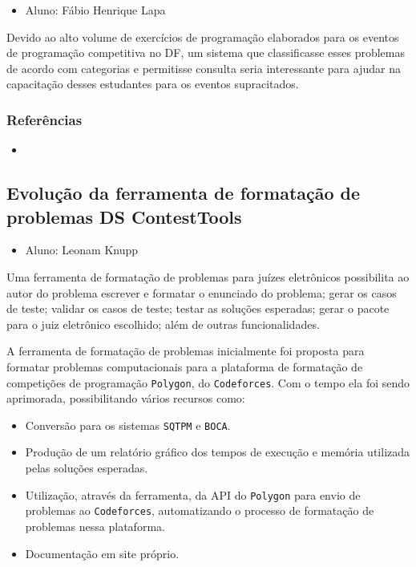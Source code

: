 \documentclass{article}
\newcommand*{\nsubsection}[1]{
    \subsection*{#1}
}
\newcommand{\polygon}{\texttt{Polygon}\xspace}
\newcommand{\codeforces}{\texttt{Codeforces}\xspace}
\newcommand{\sqtpm}{\texttt{SQTPM}\xspace}
\newcommand{\boca}{\texttt{BOCA}\xspace}
\begin{document}
\begin{itemize}
	\item Aluno: Fábio Henrique Lapa
\end{itemize}

Devido ao alto volume de exercícios de programação elaborados para os eventos de programação competitiva no DF, um sistema que classificasse esses problemas de acordo com categorias e permitisse consulta seria interessante para ajudar na capacitação desses estudantes para os eventos supracitados.



\subsubsection*{Referências}

\begin{itemize}
	\item {}
\end{itemize}


\nsubsection{Evolução da ferramenta de formatação de problemas DS ContestTools}


\begin{itemize}
	\item Aluno: Leonam Knupp
\end{itemize}


Uma ferramenta de formatação de problemas para juízes eletrônicos possibilita ao autor do problema escrever e formatar o enunciado do problema; gerar os casos de teste; validar os casos de teste; testar as soluções esperadas;  gerar o pacote para o juiz eletrônico escolhido; além de outras funcionalidades.

A ferramenta de formatação de problemas  inicialmente foi proposta para formatar problemas computacionais para a plataforma de formatação de competições de programação \polygon, do \codeforces. Com o tempo ela foi sendo aprimorada, possibilitando vários recursos como:

\begin{itemize}
	\item Conversão para os sistemas \sqtpm e \boca.
	\item Produção de um relatório gráfico dos tempos de execução e memória utilizada pelas soluções esperadas.
	\item Utilização, através da ferramenta, da API do \polygon para envio de problemas ao \codeforces, automatizando o processo de formatação de problemas nessa plataforma.
	\item Documentação em site próprio.
\end{itemize}
\end{document}
